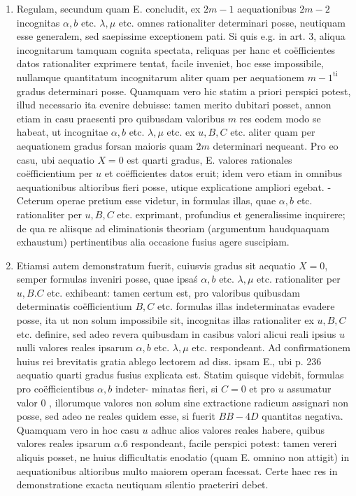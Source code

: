 \documentclass[10pt]{article}
\begin{document}
\begin{enumerate}
  \item Regulam, secundum quam E. concludit, ex \(2 m-1\) aequationibus \(2 m-2\) incognitas \(\alpha, b\) etc. \(\lambda, \mu\) etc. omnes rationaliter determinari posse, neutiquam esse generalem, sed saepissime exceptionem pati. Si quis e.g. in art. 3, aliqua incognitarum tamquam cognita spectata, reliquas per hanc et coëfficientes datos rationaliter exprimere tentat, facile inveniet, hoc esse impossibile, nullamque quantitatum incognitarum aliter quam per aequationem \(m-1^{\text {ti }}\) gradus determinari posse. Quamquam vero hic statim a priori perspici potest, illud necessario ita evenire debuisse: tamen merito dubitari posset, annon etiam in casu praesenti pro quibusdam valoribus \(m\) res eodem modo se habeat, ut incognitae \(\alpha, b\) etc. \(\lambda, \mu\) etc. ex \(u, B, C\) etc. aliter quam per aequationem gradus forsan maioris quam \(2 m\) determinari nequeant. Pro eo casu, ubi aequatio \(X=0\) est quarti gradus, E. valores rationales coëfficientium per \(u\) et coëfficientes datos eruit; idem vero etiam in omnibus aequationibus altioribus fieri posse, utique explicatione ampliori egebat. - Ceterum operae pretium esse videtur, in formulas illas, quae \(\alpha, b\) etc. rationaliter per \(u, B, C\) etc. exprimant, profundius et generalissime inquirere; de qua re aliisque ad eliminationis theoriam (argumentum haudquaquam exhaustum) pertinentibus alia occasione fusius agere suscipiam.

  \item Etiamsi autem demonstratum fuerit, cuiusvis gradus sit aequatio \(X=0\), semper formulas inveniri posse, quae ipsaś \(\alpha, b\) etc. \(\lambda, \mu\) etc. rationaliter per \(u, B . C\) etc. exhibeant: tamen certum est, pro valoribus quibusdam determinatis coëfficientium \(B, C\) etc. formulas illas indeterminatas evadere posse, ita ut non solum impossibile sit, incognitas illas rationaliter ex \(u, B, C\) etc. definire, sed adeo revera quibusdam in casibus valori alicui reali ipsius \(u\) nulli valores reales ipsarum \(\alpha, b\) etc. \(\lambda, \mu\) etc. respondeant. Ad confirmationem huius rei brevitatis gratia ablego lectorem ad diss. ipsam E., ubi p. 236 aequatio quarti gradus fusius explicata est. Statim quisque videbit, formulas pro coëfficientibus \(\alpha, b\) indeter-
minatas fieri, si \(C=0\) et pro \(u\) assumatur valor 0 , illorumque valores non solum sine extractione radicum assignari non posse, sed adeo ne reales quidem esse, si fuerit \(B B-4 D\) quantitas negativa. Quamquam vero in hoc casu \(u\) adhuc alios valores reales habere, quibus valores reales ipsarum \(\alpha .6\) respondeant, facile perspici potest: tamen vereri aliquis posset, ne huius difficultatis enodatio (quam E. omnino non attigit) in aequationibus altioribus multo maiorem operam facessat. Certe haec res in demonstratione exacta neutiquam silentio praeteriri debet.


\end{enumerate}
\end{document}
